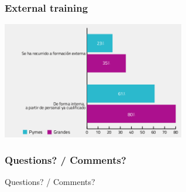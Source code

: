 \documentclass{beamer}
\begin{document}


\begin{frame}
\frametitle{External training}
\begin{center}
  \includegraphics[width=8cm]{figs/cenatic_externaltraining.png}
\end{center}
\end{frame}


\begin{frame}
\frametitle{Questions? / Comments?}
\begin{center}
\huge{Questions? / Comments?}
\end{center}
\end{frame}

\end{document}
